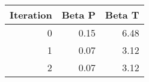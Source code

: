\begin{tabular}{rrr}
\toprule
 Iteration &  Beta P &  Beta T \\
\midrule
         0 &    0.15 &    6.48 \\
         1 &    0.07 &    3.12 \\
         2 &    0.07 &    3.12 \\
\bottomrule
\end{tabular}
